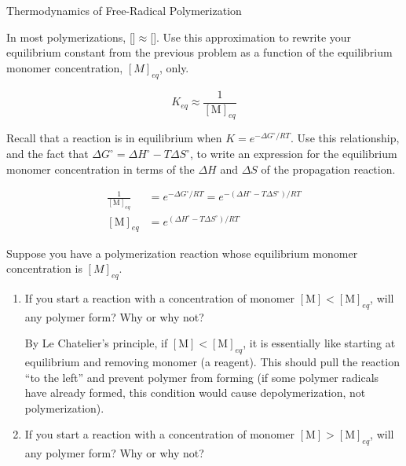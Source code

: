 \begin{activity}{Thermodynamics of Free-Radical Polymerization}
\begin{ctqs}
	\question In most polymerizations, []$\approx$[].  Use this approximation to rewrite your equilibrium constant from the previous problem as a function of the equilibrium monomer concentration, $[M]_{eq}$, only.
				
				\begin{solution}[0.5in]
					\begin{equation*}
						K_{eq}\approx \frac{1}{[\text{M}]_{eq}}
					\end{equation*}
				\end{solution}
	
	\question Recall that a reaction is in equilibrium when $K = e^{-\Delta G^\circ/RT}$.  Use this relationship, and the fact that $\Delta G^\circ = \Delta H^\circ - T\Delta S^\circ$, to write an  expression for the equilibrium monomer concentration in terms of the $\Delta H$ and $\Delta S$ of the propagation reaction. \label{\labelbase:ctq:Meq}
				
				\begin{solution}[1in]
					\begin{align*}
						\frac{1}{[\text{M}]_{eq}} &= e^{-\Delta G^\circ/RT} = e^{-(\Delta H^\circ - T\Delta S^\circ)/RT}\\
						[\text{M}]_{eq} &= e^{(\Delta H^\circ - T\Delta S^\circ)/RT}
					\end{align*}
				\end{solution}
	
	\question Suppose you have a polymerization reaction whose equilibrium monomer concentration is $[M]_{eq}$.  
		\begin{enumerate}
			\item If you start a reaction with a concentration of monomer $[\text{M}] < [\text{M}]_{eq}$, will any polymer form?  Why or why not?
				
				\begin{solution}[1in]
					By Le Chatelier's principle, if $[\text{M}] < [\text{M}]_{eq}$, it is essentially like starting at equilibrium and removing monomer (a reagent).  This should pull the reaction ``to the left'' and prevent polymer from forming (if some polymer radicals have already formed, this condition would cause depolymerization, not polymerization).
				\end{solution}
				
			\item If you start a reaction with a concentration of monomer $[\text{M}] > [\text{M}]_{eq}$, will any polymer form?  Why or why not?
				

\end{enumerate}
\end{ctqs}
\end{activity}
